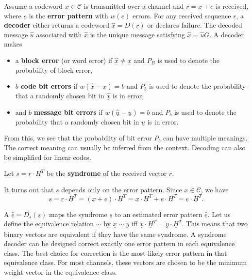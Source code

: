 Assume a codeword $\underline{x}\in\mathcal{C}$ is transmitted over a channel and $\underline{r}=\underline{x}+\underline{e}$ is received, where $\underline{e}$ is the \textbf{error pattern} with $w(\underline{e})$ errors.
For any received sequence $\underline{r}$, a \textbf{decoder} either returns a codeword $\underline{\hat{x}}=D(\underline{r})$ or declares failure.
The decoded message $\underline{\hat{u}}$ associated with $\underline{\hat{x}}$ is the unique message satisfying $\underline{\hat{x}} = \underline{\hat{u}} \underline{G}$.
A decoder makes
\begin{itemize}
\item a \textbf{block error} (or word error) if $\underline{\hat{x}}\neq\underline{x}$ and $P_{B}$ is used to denote the probability of block error,
\item $b$ \textbf{code bit errors} if $w(\underline{\hat{x}}-\underline{x})=b$ and $P_{b}$ is used to denote the probability that a randomly chosen bit in $\underline{\hat{x}}$ is in error,
\item and $b$ \textbf{message bit errors} if $w(\underline{\hat{u}}-\underline{u})=b$ and $P_{b}$ is used to denote the probability that a randomly chosen bit in $\underline{\hat{u}}$ is in error.
\end{itemize}
From this, we see that the probability of bit error $P_{b}$ can have multiple meanings.
The correct meaning can usually be inferred from the context.
Decoding can also be simplified for linear codes.

\begin{definition}
Let $\underline{s}=\underline{r}\cdot\underline{H}^{T}$ be the \textbf{syndrome} of the received vector $\underline{r}$.
\end{definition}
It turns out that $\underline{s}$ depends only on the error pattern.
Since $\underline{x}\in\mathcal{C}$, we have
\[ \underline{s}=\underline{r}\cdot\underline{H}^{T}=(\underline{x}+\underline{e})\cdot\underline{H}^{T}=\underline{x}\cdot\underline{H}^{T}+\underline{e}\cdot\underline{H}^{T}=\underline{e}\cdot\underline{H}^{T}. \]

A  $\underline{\hat{e}}=D_{s}(\underline{s})$ maps the syndrome $\underline{s}$ to an estimated error pattern $\underline{\hat{e}}$.
Let us define the equivalence relation $\sim$ by $\underline{x}\sim\underline{y}$ iff $\underline{x}\cdot\underline{H}^{T}=\underline{y}\cdot\underline{H}^{T}$.
This means that two binary vectors are equivalent if they have the same syndrome.
A syndrome decoder can be designed correct exactly one error pattern in each equivalence class.
The best choice for correction is the most-likely error pattern in that equivalence class.
For most channels, these vectors are chosen to be the minimum weight vector in the equivalence class.

